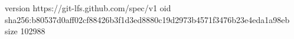 version https://git-lfs.github.com/spec/v1
oid sha256:b80537d0aff02cf88426b3f1d3ed8880c19d2973b4571f3476b23e4eda1a98eb
size 102988
